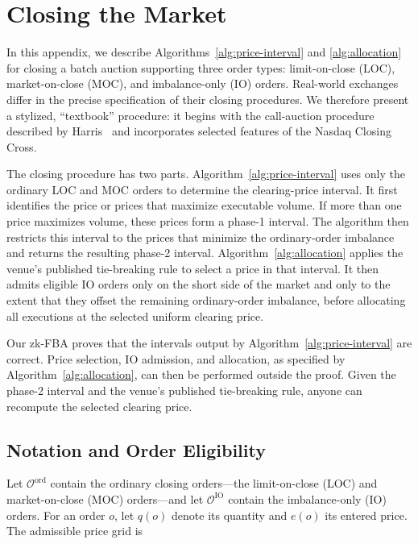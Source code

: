 

\section{Closing the Market}
\label{sec:market-close}

In this appendix, we describe Algorithms~\ref{alg:price-interval} and
\ref{alg:allocation} for closing a batch auction supporting three order types:
limit-on-close (LOC), market-on-close (MOC), and imbalance-only (IO) orders.
Real-world exchanges differ in the precise specification of their closing
procedures. We therefore present a stylized, ``textbook'' procedure: it begins
with the call-auction procedure described by Harris~\cite{Har03} and
incorporates selected features of the Nasdaq Closing Cross.

The closing procedure has two parts. Algorithm~\ref{alg:price-interval} uses
only the ordinary LOC and MOC orders to determine the clearing-price interval.
It first identifies the price or prices that maximize executable volume. If
more than one price maximizes volume, these prices form a phase-1 interval.
The algorithm then restricts this interval to the prices that minimize the
ordinary-order imbalance and returns the resulting phase-2 interval.
Algorithm~\ref{alg:allocation} applies the venue's published tie-breaking rule
to select a price in that interval. It then admits eligible IO orders only on
the short side of the market and only to the extent that they offset the
remaining ordinary-order imbalance, before allocating all executions at the
selected uniform clearing price.

Our zk-FBA proves that the intervals output by
Algorithm~\ref{alg:price-interval} are correct. Price selection, IO admission,
and allocation, as specified by Algorithm~\ref{alg:allocation}, can then be
performed outside the proof. Given the phase-2 interval and the venue's
published tie-breaking rule, anyone can recompute the selected clearing price.

\subsection{Notation and Order Eligibility}
\label{sec:close-notation}

Let $\mathcal{O}^{\mathrm{ord}}$ contain the ordinary closing orders---the
limit-on-close (LOC) and market-on-close (MOC) orders---and let
$\mathcal{O}^{\mathrm{IO}}$ contain the imbalance-only (IO) orders. For an
order $o$, let $q(o)$ denote its quantity and $e(o)$ its entered price. The
admissible price grid is

